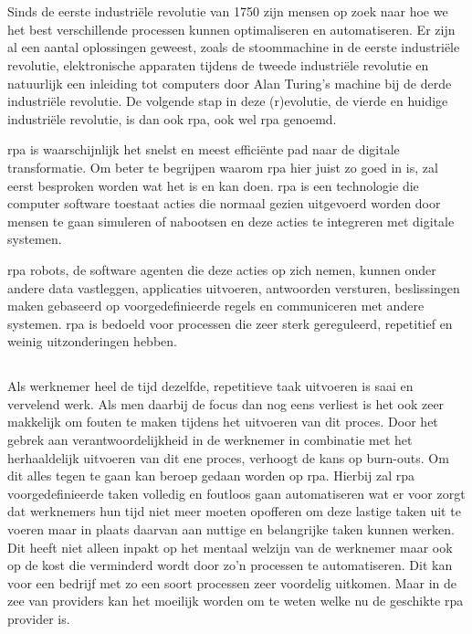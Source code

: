 
\chapter{}
\label{ch:inleiding}
Sinds de eerste industriële revolutie van 1750 zijn mensen op zoek naar hoe we het best verschillende processen kunnen optimaliseren en automatiseren. Er zijn al een aantal oplossingen geweest, zoals de stoommachine in de eerste industriële revolutie, elektronische apparaten tijdens de tweede industriële revolutie en natuurlijk een inleiding tot computers door Alan Turing's machine bij de derde industriële revolutie. De volgende stap in deze (r)evolutie, de vierde en huidige industriële revolutie, is dan ook \acrlong{rpa}, ook wel \acrshort{rpa} genoemd. \autocite{indusRev}

\acrshort{rpa} is waarschijnlijk het snelst en meest efficiënte pad naar de digitale transformatie. Om beter te begrijpen waarom \acrshort{rpa} hier juist zo goed in is, zal eerst besproken worden wat het is en kan doen. \acrshort{rpa} is een technologie die computer software toestaat acties die normaal gezien uitgevoerd worden door mensen te gaan simuleren of nabootsen en deze acties te integreren met digitale systemen.

\acrshort{rpa} robots, de software agenten die deze acties op zich nemen, kunnen onder andere data vastleggen, applicaties uitvoeren, antwoorden versturen, beslissingen maken gebaseerd op voorgedefinieerde regels en communiceren met andere systemen. \acrshort{rpa} is bedoeld voor processen die zeer sterk gereguleerd, repetitief en weinig uitzonderingen hebben.

\section{}
\label{sec:probleemstelling}
Als werknemer heel de tijd dezelfde, repetitieve taak uitvoeren is saai en vervelend werk. Als men daarbij de focus dan nog eens verliest is het ook zeer makkelijk om fouten te maken tijdens het uitvoeren van dit proces. Door het gebrek aan verantwoordelijkheid in de werknemer in combinatie met het herhaaldelijk uitvoeren van dit ene proces, verhoogt de kans op burn-outs. Om dit alles tegen te gaan kan beroep gedaan worden op \acrlong{rpa}. Hierbij zal \acrshort{rpa} voorgedefinieerde taken volledig en foutloos gaan automatiseren wat er voor zorgt dat werknemers hun tijd niet meer moeten opofferen om deze lastige taken uit te voeren maar in plaats daarvan aan nuttige en belangrijke taken kunnen werken. Dit heeft niet alleen inpakt op het mentaal welzijn van de werknemer maar ook op de kost die verminderd wordt door zo'n processen te automatiseren. Dit kan voor een bedrijf met zo een soort processen zeer voordelig uitkomen. Maar in de zee van providers kan het moeilijk worden om te weten welke nu de geschikte \acrshort{rpa} provider is.

